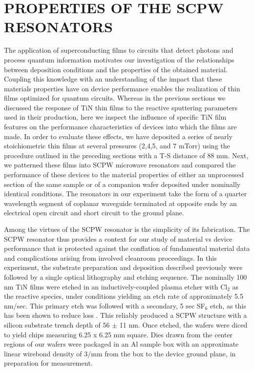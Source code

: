 \documentclass{report}
\begin{document}
\section{PROPERTIES OF THE SCPW RESONATORS}
The application of superconducting films to circuits that detect photons and process quantum information motivates our investigation of the relationships between deposition conditions and the properties of the obtained material. Coupling this knowledge with an understanding of the impact that these materials properties have on device performance enables the realization of thin films optimized for quantum circuits.  Whereas in the previous sections we discussed the response of TiN thin films to the reactive sputtering parameters used in their production, here we inspect the influence of specific TiN film features on the performance characteristics of devices into which the films are made.  In order to evaluate these effects, we have deposited a series of nearly stoichiometric thin films at several pressures (2,4,5, and 7 mTorr) using the procedure outlined in the preceding sections with a T-S distance of 88 mm.  Next, we patterned these films into SCPW microwave resonators and compared the performance of these devices to the material properties of either an unprocessed section of the same sample or of a companion wafer deposited under nominally identical conditions.  The resonators in our experiment take the form of a quarter wavelength segment of coplanar waveguide terminated at opposite ends by an electrical open circuit and short circuit to the ground plane.

Among the virtues of the SCPW resonator is the simplicity of its fabrication.  The SCPW resonator thus provides a context for our study of material vs device performance that is protected against the conflation of fundamental material data and complications arising from involved cleanroom proceedings.  In this experiment, the substrate preparation and deposition described previously were followed by a single optical lithography and etching sequence. The nominally 100 nm TiN films were etched in an inductively-coupled plasma etcher with Cl$_{2} $ as the reactive species, under conditions yielding an etch rate of approximately 5.5 nm/sec.  This primary etch was followed with a secondary, 5 sec SF$_{6}$ etch, as this has been shown to reduce loss \cite{Sandberg2012}.  This reliably produced a SCPW structure with a silicon substrate trench depth of 56 $\pm$ 11 nm.  Once etched, the wafers were diced to yield chips measuring 6.25 x 6.25 mm square.  Dies drawn from the center regions of our wafers were packaged in an Al sample box with an approximate linear wirebond density of 3/mm from the box to the device ground plane, in preparation for measurement.
\end{document}
